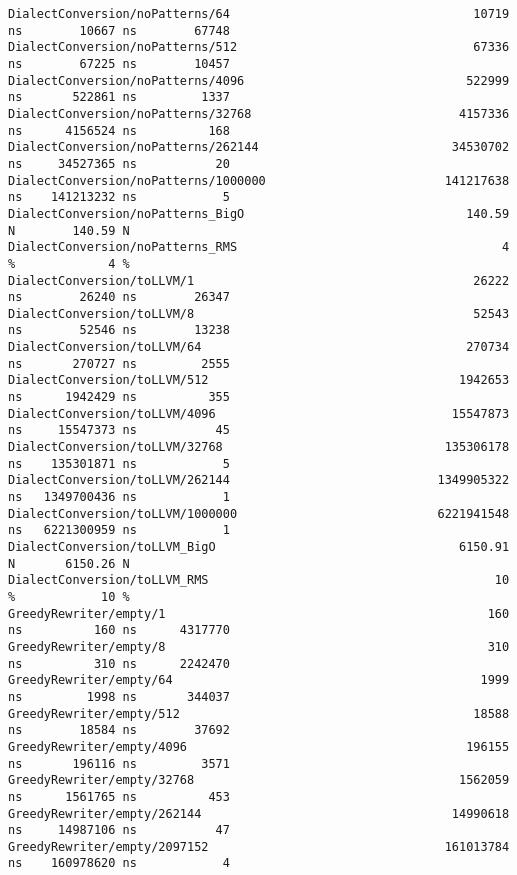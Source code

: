 \begin{code}
\begin{verbatim}
DialectConversion/noPatterns/64                                  10719 ns        10667 ns        67748
DialectConversion/noPatterns/512                                 67336 ns        67225 ns        10457
DialectConversion/noPatterns/4096                               522999 ns       522861 ns         1337
DialectConversion/noPatterns/32768                             4157336 ns      4156524 ns          168
DialectConversion/noPatterns/262144                           34530702 ns     34527365 ns           20
DialectConversion/noPatterns/1000000                         141217638 ns    141213232 ns            5
DialectConversion/noPatterns_BigO                               140.59 N        140.59 N
DialectConversion/noPatterns_RMS                                     4 %             4 %
DialectConversion/toLLVM/1                                       26222 ns        26240 ns        26347
DialectConversion/toLLVM/8                                       52543 ns        52546 ns        13238
DialectConversion/toLLVM/64                                     270734 ns       270727 ns         2555
DialectConversion/toLLVM/512                                   1942653 ns      1942429 ns          355
DialectConversion/toLLVM/4096                                 15547873 ns     15547373 ns           45
DialectConversion/toLLVM/32768                               135306178 ns    135301871 ns            5
DialectConversion/toLLVM/262144                             1349905322 ns   1349700436 ns            1
DialectConversion/toLLVM/1000000                            6221941548 ns   6221300959 ns            1
DialectConversion/toLLVM_BigO                                  6150.91 N       6150.26 N
DialectConversion/toLLVM_RMS                                        10 %            10 %
GreedyRewriter/empty/1                                             160 ns          160 ns      4317770
GreedyRewriter/empty/8                                             310 ns          310 ns      2242470
GreedyRewriter/empty/64                                           1999 ns         1998 ns       344037
GreedyRewriter/empty/512                                         18588 ns        18584 ns        37692
GreedyRewriter/empty/4096                                       196155 ns       196116 ns         3571
GreedyRewriter/empty/32768                                     1562059 ns      1561765 ns          453
GreedyRewriter/empty/262144                                   14990618 ns     14987106 ns           47
GreedyRewriter/empty/2097152                                 161013784 ns    160978620 ns            4

\end{verbatim}
\end{code}

